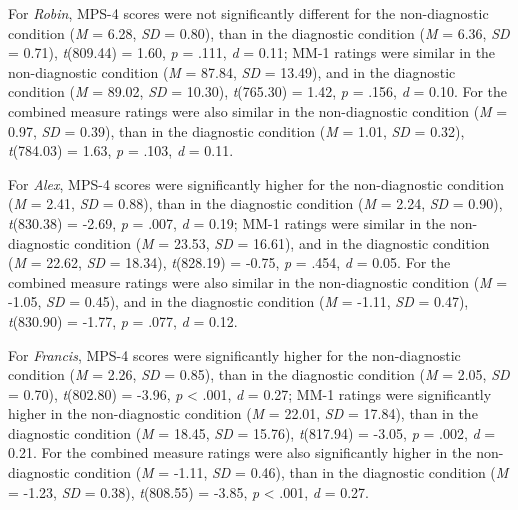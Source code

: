 \documentclass[
  man,floatsintext]{apa6}
\begin{document}
For \emph{Robin}, MPS-4 scores were not significantly different for the non-diagnostic condition (\emph{M} = 6.28, \emph{SD} = 0.80), than in the diagnostic condition (\emph{M} = 6.36, \emph{SD} = 0.71), \emph{t}(809.44) = 1.60, \emph{p} = .111, \emph{d} = 0.11; MM-1 ratings were similar in the non-diagnostic condition (\emph{M} = 87.84, \emph{SD} = 13.49), and in the diagnostic condition (\emph{M} = 89.02, \emph{SD} = 10.30), \emph{t}(765.30) = 1.42, \emph{p} = .156, \emph{d} = 0.10. For the combined measure ratings were also similar in the non-diagnostic condition (\emph{M} = 0.97, \emph{SD} = 0.39), than in the diagnostic condition (\emph{M} = 1.01, \emph{SD} = 0.32), \emph{t}(784.03) = 1.63, \emph{p} = .103, \emph{d} = 0.11.

For \emph{Alex}, MPS-4 scores were significantly higher for the non-diagnostic condition (\emph{M} = 2.41, \emph{SD} = 0.88), than in the diagnostic condition (\emph{M} = 2.24, \emph{SD} = 0.90), \emph{t}(830.38) = -2.69, \emph{p} = .007, \emph{d} = 0.19; MM-1 ratings were similar in the non-diagnostic condition (\emph{M} = 23.53, \emph{SD} = 16.61), and in the diagnostic condition (\emph{M} = 22.62, \emph{SD} = 18.34), \emph{t}(828.19) = -0.75, \emph{p} = .454, \emph{d} = 0.05. For the combined measure ratings were also similar in the non-diagnostic condition (\emph{M} = -1.05, \emph{SD} = 0.45), and in the diagnostic condition (\emph{M} = -1.11, \emph{SD} = 0.47), \emph{t}(830.90) = -1.77, \emph{p} = .077, \emph{d} = 0.12.

For \emph{Francis}, MPS-4 scores were significantly higher for the non-diagnostic condition (\emph{M} = 2.26, \emph{SD} = 0.85), than in the diagnostic condition (\emph{M} = 2.05, \emph{SD} = 0.70), \emph{t}(802.80) = -3.96, \emph{p} \textless{} .001, \emph{d} = 0.27; MM-1 ratings were significantly higher in the non-diagnostic condition (\emph{M} = 22.01, \emph{SD} = 17.84), than in the diagnostic condition (\emph{M} = 18.45, \emph{SD} = 15.76), \emph{t}(817.94) = -3.05, \emph{p} = .002, \emph{d} = 0.21. For the combined measure ratings were also significantly higher in the non-diagnostic condition (\emph{M} = -1.11, \emph{SD} = 0.46), than in the diagnostic condition (\emph{M} = -1.23, \emph{SD} = 0.38), \emph{t}(808.55) = -3.85, \emph{p} \textless{} .001, \emph{d} = 0.27.
\end{document}
